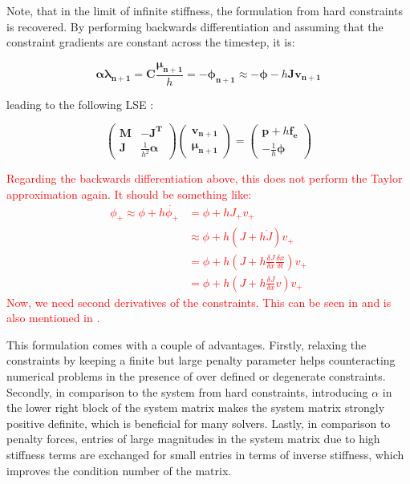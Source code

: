 Note, that in the limit of infinite stiffness, the formulation from hard constraints is recovered. By performing backwards differentiation and 
assuming that the constraint gradients are constant across the timestep, it is:

\[
    \bm{\alpha\lambda_{n+1}} = \bm{C}\frac{\bm{\mu_{n+1}}}{h} = -\bm{\phi_{n+1}} \approx -\bm{\phi} - h\bm{Jv_{n+1}}
\]

leading to the following LSE \cite{tournier2015}:

\[
\begin{pmatrix}
    \bm{M} & \bm{-J^T} \\
    \bm{J} & \frac{1}{h^2}\bm{\alpha}
\end{pmatrix}
\begin{pmatrix}
    \bm{v_{n+1}} \\
    \bm{\mu_{n+1}}
\end{pmatrix}
=
\begin{pmatrix}
    \bm{p} + h\bm{f_e} \\
    - \frac{1}{h}\bm{\phi}
\end{pmatrix}
\]

\textcolor{red}{Regarding the backwards differentiation above, this does not perform the Taylor approximation again. It should be something
like:
\begin{align*}
    \phi_+ \approx \phi + h\dot{\phi_+} &= \phi + hJ_+v_+ \\
                                        &\approx \phi + h(J + h\dot{J})v_+ \\
                                        &= \phi + h(J + h\frac{\delta J}{\delta x}\frac{\delta x}{\delta t})v_+ \\
                                        &= \phi + h(J + h\frac{\delta J}{\delta x}v)v_+
\end{align*}
Now, we need second derivatives of the constraints. This can be seen in \cite{baraff1998} and is also mentioned in \cite{servin2006}.
}

This formulation comes with a couple of advantages. Firstly, relaxing the constraints by keeping a finite but large penalty parameter helps
counteracting numerical problems in the presence of over defined or degenerate constraints. Secondly, in comparison to the system from hard
constraints, introducing $\alpha$ in the lower right block of the system matrix makes the system matrix strongly positive definite, which 
is beneficial for many solvers. Lastly, in comparison to penalty forces, entries of large magnitudes in the system matrix due to high 
stiffness terms are exchanged for small entries in terms of inverse stiffness, which improves the condition number of the matrix. 


